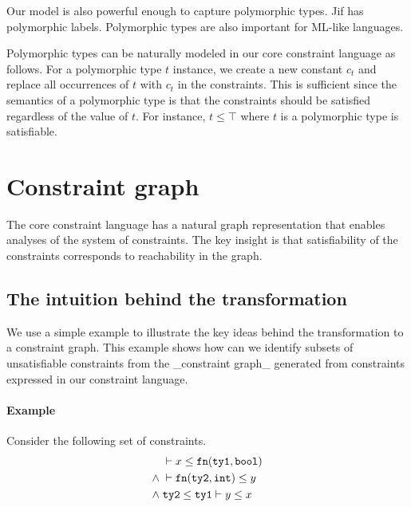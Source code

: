 Our model is also powerful enough to capture polymorphic types.  Jif
has polymorphic labels. Polymorphic types are also important for
ML-like languages.

Polymorphic types can be naturally modeled in our core constraint
language as follows. For a polymorphic type $t$ instance, we create a
new constant $c_t$ and replace all occurrences of $t$ with $c_t$ in
the constraints. This is sufficient since the semantics of a
polymorphic type is that the constraints should be satisfied
regardless of the value of $t$. For instance, $t\leq \top$ where $t$
is a polymorphic type is satisfiable.
\fi

\section{Constraint graph} 
\label{sec:graph}

The core constraint language has a natural graph representation that
enables analyses of the system of constraints. The key insight is that
satisfiability of the constraints corresponds to reachability in the
graph.


\subsection{The intuition behind the transformation}

We use a simple example to illustrate the key ideas behind the
transformation to a constraint graph.  This example shows how can we
identify subsets of unsatisfiable constraints from the _constraint
graph_ generated from constraints expressed in our constraint
language.

\paragraph{Example} Consider the following set of constraints.
\begin{align*}
      &\; \vdash x \leq \mathtt{fn} (\mathtt{ty1}, \mathtt{bool}) \\
\land &\; \vdash \mathtt{fn} (\mathtt{ty2}, \mathtt{int}) \leq y \\
\land &\; \mathtt{ty2} \leq \mathtt{ty1} \vdash y \leq x
\end{align*}

